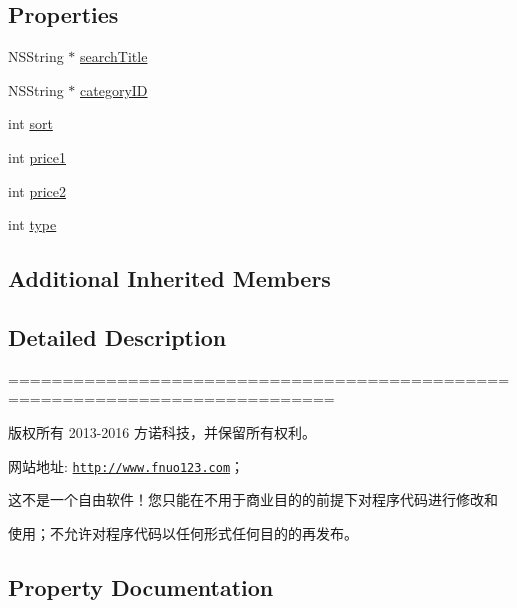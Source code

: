 \subsection*{Properties}
\begin{DoxyCompactItemize}
\item 
N\+S\+String $\ast$ \mbox{\hyperlink{interface_product_list_view_controller_a07b46b0d935fb75f5098eccbb83e7657}{search\+Title}}
\item 
N\+S\+String $\ast$ \mbox{\hyperlink{interface_product_list_view_controller_aafac2f2c04dd57adb4d03fa0904ec45f}{category\+ID}}
\item 
int \mbox{\hyperlink{interface_product_list_view_controller_a59d788898afd2b25481facc9d08262d4}{sort}}
\item 
int \mbox{\hyperlink{interface_product_list_view_controller_ac0bcf07d6a13a20feae48c204e7edaa8}{price1}}
\item 
int \mbox{\hyperlink{interface_product_list_view_controller_a7018ac13938345c65de90233ba266cf4}{price2}}
\item 
int \mbox{\hyperlink{interface_product_list_view_controller_a045b21f55b61b30174c30f46ffa59898}{type}}
\end{DoxyCompactItemize}
\subsection*{Additional Inherited Members}


\subsection{Detailed Description}
============================================================================

版权所有 2013-\/2016 方诺科技，并保留所有权利。

网站地址\+: \href{http://www.fnuo123.com}{\tt http\+://www.\+fnuo123.\+com}； 



这不是一个自由软件！您只能在不用于商业目的的前提下对程序代码进行修改和

使用；不允许对程序代码以任何形式任何目的的再发布。 

 

\subsection{Property Documentation}
\mbox{\label{interface_product_list_view_controller_aafac2f2c04dd57adb4d03fa0904ec45f}} 

